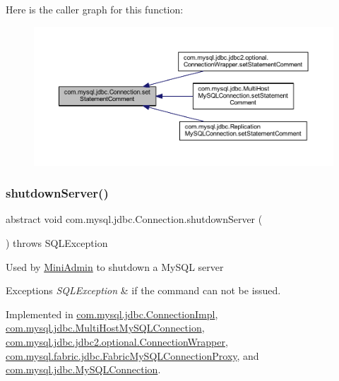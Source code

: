 Here is the caller graph for this function\+:\nopagebreak
\begin{figure}[H]
\begin{center}
\leavevmode
\includegraphics[width=350pt]{interfacecom_1_1mysql_1_1jdbc_1_1_connection_a94f38f8f7d8afd2a7bf6c87ad0d5d422_icgraph}
\end{center}
\end{figure}
\mbox{\label{interfacecom_1_1mysql_1_1jdbc_1_1_connection_a58ca482a0546e93af285d0e9836d7fae}} 
\subsubsection{\texorpdfstring{shutdown\+Server()}{shutdownServer()}}
{\footnotesize\ttfamily abstract void com.\+mysql.\+jdbc.\+Connection.\+shutdown\+Server (\begin{DoxyParamCaption}{ }\end{DoxyParamCaption}) throws S\+Q\+L\+Exception\hspace{0.3cm}{\ttfamily [abstract]}}

Used by \mbox{\hyperlink{classcom_1_1mysql_1_1jdbc_1_1_mini_admin}{Mini\+Admin}} to shutdown a My\+S\+QL server


\begin{DoxyExceptions}{Exceptions}
{\em S\+Q\+L\+Exception} & if the command can not be issued. \\
\hline
\end{DoxyExceptions}


Implemented in \mbox{\hyperlink{classcom_1_1mysql_1_1jdbc_1_1_connection_impl_a3c07294052ff8c623efdb0478dff6cde}{com.\+mysql.\+jdbc.\+Connection\+Impl}}, \mbox{\hyperlink{classcom_1_1mysql_1_1jdbc_1_1_multi_host_my_s_q_l_connection_a84e14d759493436465fa6bf6160e5153}{com.\+mysql.\+jdbc.\+Multi\+Host\+My\+S\+Q\+L\+Connection}}, \mbox{\hyperlink{classcom_1_1mysql_1_1jdbc_1_1jdbc2_1_1optional_1_1_connection_wrapper_a23e3bc174ec3f98397698fcddc3d3ca0}{com.\+mysql.\+jdbc.\+jdbc2.\+optional.\+Connection\+Wrapper}}, \mbox{\hyperlink{classcom_1_1mysql_1_1fabric_1_1jdbc_1_1_fabric_my_s_q_l_connection_proxy_ac227e92bb718704cd526d8bc728303c7}{com.\+mysql.\+fabric.\+jdbc.\+Fabric\+My\+S\+Q\+L\+Connection\+Proxy}}, and \mbox{\hyperlink{interfacecom_1_1mysql_1_1jdbc_1_1_my_s_q_l_connection_ab6fa367972e51a54bc186f7856568098}{com.\+mysql.\+jdbc.\+My\+S\+Q\+L\+Connection}}.

